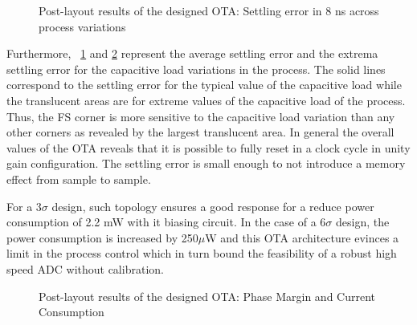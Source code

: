 \begin{figure}[htp]
    \centering
    \begin{subfigure}[b]{0.48\textwidth}
        \resizebox{\textwidth}{!}{
            
        }
        \label{fig:ota_error_400fF_temp_corners}
    \end{subfigure}
    \begin{subfigure}[b]{0.48\textwidth}
        \resizebox{\textwidth}{!}{
            
        }
        \label{fig:ota_error_1pF_temp_corners}
    \end{subfigure}
    \caption{Post-layout results of the designed OTA: Settling error in 8 ns across process variations}
    \label{fig:ota_result-2}
\end{figure}

Furthermore, \figurename~\ref{fig:ota_error_400fF_temp_corners} and \ref{fig:ota_error_1pF_temp_corners} represent the average settling error and the extrema settling error for the capacitive load variations in the process. The solid lines correspond to the settling error for the typical value of the capacitive load while the translucent areas are for extreme values of the capacitive load of the process. Thus, the FS corner is more sensitive to the capacitive load variation than any other corners as revealed by the largest translucent area. In general the overall values of the OTA reveals that it is possible to fully reset in a clock cycle in unity gain configuration. The settling error is small enough to not introduce a memory effect from sample to sample.

For a \(3\sigma \) design, such topology ensures a good response for a reduce power consumption of 2.2 mW with it biasing circuit. In the case of a \(6\sigma \) design, the power consumption is increased by 250\(\mu \)W and this OTA architecture evinces a limit in the process control which in turn bound the feasibility of a robust high speed ADC without calibration.

\begin{figure}[htp]
    \centering
    \begin{subfigure}[b]{0.48\textwidth}
        \resizebox{\textwidth}{!}{
            
        }
        \label{fig:ota_pm_temp_corners}
    \end{subfigure}
    \begin{subfigure}[b]{0.48\textwidth}
        \resizebox{\textwidth}{!}{
            
        }
        \label{fig:ota_pow_temp_corners}
    \end{subfigure}
    \caption{Post-layout results of the designed OTA: Phase Margin and Current Consumption}
    \label{fig:ota_result-3}
\end{figure}

